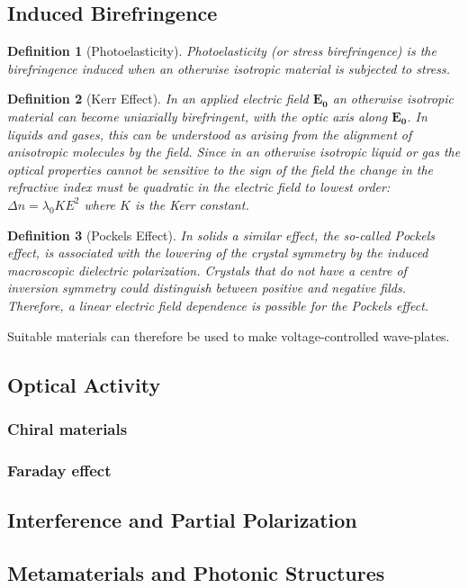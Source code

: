 \documentclass[a4paper]{article}
\newtheorem{defi}{Definition}[section]
\theoremstyle{new}
\begin{document}
\subsection{Induced Birefringence}
\begin{defi}[Photoelasticity]
Photoelasticity (or stress birefringence) is the birefringence induced when an otherwise isotropic material is subjected to stress.
\end{defi}
\begin{defi}[Kerr Effect]
In an applied electric field $\mathbf{E_0}$ an otherwise isotropic material can become uniaxially birefringent, with the optic axis along $\mathbf{E_0}$. In liquids and gases, this can be understood as arising from the alignment of anisotropic molecules by the field. Since in an otherwise isotropic liquid or gas the optical properties cannot be sensitive to the sign of the field the change in the refractive index must be quadratic in the electric field to lowest order: $\Delta n=\lambda_0KE^2$ where $K$ is the Kerr constant. 
\end{defi}
\begin{defi}[Pockels Effect]
In solids a similar effect, the so-called Pockels effect, is associated with the lowering of the crystal symmetry by the induced macroscopic dielectric polarization. Crystals that do not have a centre of inversion symmetry could distinguish between positive and negative filds. Therefore, a linear electric field dependence is possible for the Pockels effect.
\end{defi}
Suitable materials can therefore be used to make voltage-controlled wave-plates.
\newpage
\subsection{Optical Activity}
\subsubsection{Chiral materials}
\subsubsection{Faraday effect}
\newpage
\subsection{Interference and Partial Polarization}
\subsection{Metamaterials and Photonic Structures}
\end{document}
